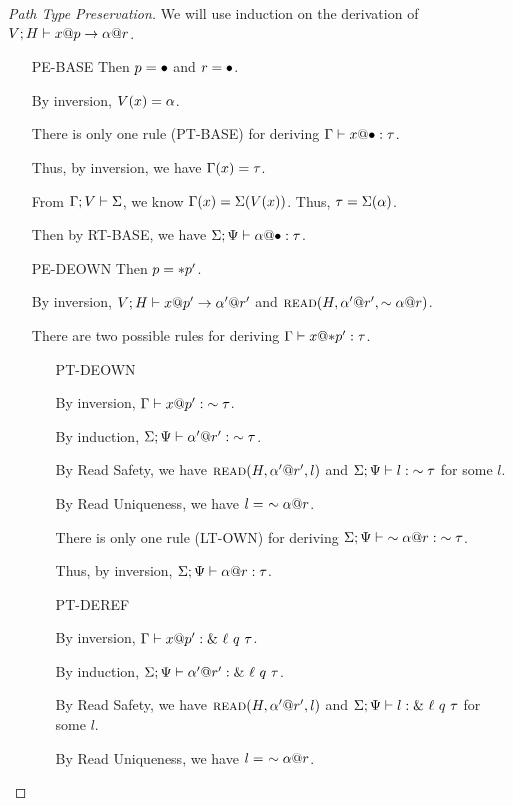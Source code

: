 \begin{proof}[Path Type Preservation]
  We will use induction on the derivation of ${V;H} \vdash {{x}@{p}} \to {{\alpha}@{r}}$.
  \begin{itemize}
    \item[PE-BASE] Then $p = \bullet$ and $r = \bullet$.

      By inversion, $V(x)=\alpha$.

      There is only one rule (\textsc{PT-BASE}) for deriving ${\Gamma} \vdash {{x}@{\bullet}} : {\tau}$.

      Thus, by inversion, we have $\Gamma(x)=\tau$.

      From $\Gamma;V\vdash\Sigma$, we know $\Gamma(x)=\Sigma(V(x))$. Thus, $\tau=\Sigma(\alpha)$.

      Then by \textsc{RT-BASE}, we have ${\Sigma;\Psi} \vdash {{\alpha}@{\bullet}} : {\tau}$.
    \item[PE-DEOWN] Then $p = *{p'}$.

      By inversion, ${V;H} \vdash {{x}@{p'}} \to {{\alpha'}@{r'}}$
      and $\textsc{read}({H},{{\alpha'}@{r'}},{\sim{{\alpha}@{r}}})$.

      There are two possible rules for deriving ${\Gamma} \vdash {{x}@{*{p'}}} : {\tau}$.
      \begin{itemize}
	\item[PT-DEOWN]

	  By inversion, ${\Gamma} \vdash {{x}@{p'}} : {\sim{\tau}}$.

	  By induction, ${\Sigma;\Psi} \vdash {{\alpha'}@{r'}} : {\sim{\tau}}$.

	  By Read Safety, we have $\textsc{read}({H},{{\alpha'}@{r'}},{l})$
	  and ${\Sigma;\Psi} \vdash {l} : {\sim{\tau}}$ for some $l$.

	  By Read Uniqueness, we have $l =\ \own{\addr{\ga}{r}}$.

	  There is only one rule (\textsc{LT-OWN}) for deriving 
	  ${\Sigma;\Psi} \vdash {\sim{{\alpha}@{r}}} : {\sim{\tau}}$.

	  Thus, by inversion, ${\Sigma;\Psi} \vdash {{\alpha}@{r}} : {\tau}$.
	\item[PT-DEREF]

	  By inversion, ${\Gamma} \vdash {{x}@{p'}} : {\&~{{\ell}~{q}~{\tau}}}$.

	  By induction, ${\Sigma;\Psi} \vdash {{\alpha'}@{r'}} : {\&~{{\ell}~{q}~{\tau}}}$.

	  By Read Safety, we have $\textsc{read}({H},{{\alpha'}@{r'}},{l})$
	  and ${\Sigma;\Psi} \vdash {l} : {\&~{{\ell}~{q}~{\tau}}}$ for some $l$.

	  By Read Uniqueness, we have $l =\ \own{\addr{\ga}{r}}$.


\end{itemize}
\end{itemize}
\end{proof}
